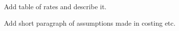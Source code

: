  Add table of rates and describe it.

 Add short paragraph of assumptions made in costing etc.

%
%
